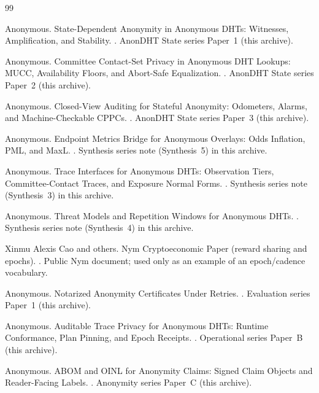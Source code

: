 \documentclass[11pt]{article}
\begin{document}
\begin{thebibliography}{99}\small

Anonymous.
\newblock State-Dependent Anonymity in Anonymous DHTs: Witnesses, Amplification, and Stability.
.
\newblock AnonDHT State series Paper~1 (this archive).

Anonymous.
\newblock Committee Contact-Set Privacy in Anonymous DHT Lookups: MUCC, Availability Floors, and Abort-Safe Equalization.
.
\newblock AnonDHT State series Paper~2 (this archive).

Anonymous.
\newblock Closed-View Auditing for Stateful Anonymity: Odometers, Alarms, and Machine-Checkable CPPCs.
.
\newblock AnonDHT State series Paper~3 (this archive).

Anonymous.
\newblock Endpoint Metrics Bridge for Anonymous Overlays: Odds Inflation, PML, and MaxL.
.
\newblock Synthesis series note (Synthesis~5) in this archive.

Anonymous.
\newblock Trace Interfaces for Anonymous DHTs: Observation Tiers, Committee-Contact Traces, and Exposure Normal Forms.
.
\newblock Synthesis series note (Synthesis~3) in this archive.

Anonymous.
\newblock Threat Models and Repetition Windows for Anonymous DHTs.
.
\newblock Synthesis series note (Synthesis~4) in this archive.

Xinmu Alexis Cao and others.
\newblock Nym Cryptoeconomic Paper (reward sharing and epochs).
.
\newblock Public Nym document; used only as an example of an epoch/cadence vocabulary.



Anonymous.
\newblock Notarized Anonymity Certificates Under Retries.
.
\newblock Evaluation series Paper~1 (this archive).

Anonymous.
\newblock Auditable Trace Privacy for Anonymous DHTs: Runtime Conformance, Plan Pinning, and Epoch Receipts.
.
\newblock Operational series Paper~B (this archive).

Anonymous.
\newblock ABOM and OINL for Anonymity Claims: Signed Claim Objects and Reader-Facing Labels.
.
\newblock Anonymity series Paper~C (this archive).


\end{thebibliography}
\end{document}
